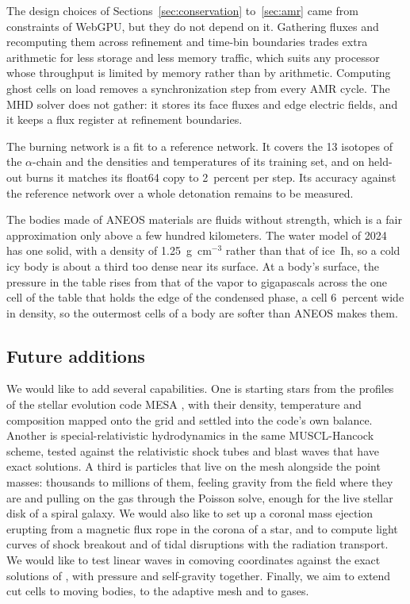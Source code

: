 \documentclass[twocolumn]{aastex701}
\begin{document}
The design choices of Sections~\ref{sec:conservation} to~\ref{sec:amr} came from constraints of WebGPU, but they do not depend on it. Gathering fluxes and recomputing them across refinement and time-bin boundaries trades extra arithmetic for less storage and less memory traffic, which suits any processor whose throughput is limited by memory rather than by arithmetic. Computing ghost cells on load removes a synchronization step from every AMR cycle. The MHD solver does not gather: it stores its face fluxes and edge electric fields, and it keeps a flux register at refinement boundaries.

The burning network is a fit to a reference network. It covers the 13 isotopes of the $\alpha$-chain and the densities and temperatures of its training set, and on held-out burns it matches its float64 copy to 2~percent per step. Its accuracy against the reference network over a whole detonation remains to be measured.

The bodies made of ANEOS materials are fluids without strength, which is a fair approximation only above a few hundred kilometers. The water model of 2024 has one solid, with a density of 1.25~g~cm$^{-3}$ rather than that of ice~Ih, so a cold icy body is about a third too dense near its surface. At a body's surface, the pressure in the table rises from that of the vapor to gigapascals across the one cell of the table that holds the edge of the condensed phase, a cell 6~percent wide in density, so the outermost cells of a body are softer than ANEOS makes them.

\subsection{Future additions}
\label{sec:future}

We would like to add several capabilities. One is starting stars from the profiles of the stellar evolution code MESA \citep{Paxton2011}, with their density, temperature and composition mapped onto the grid and settled into the code's own balance. Another is special-relativistic hydrodynamics in the same MUSCL-Hancock scheme, tested against the relativistic shock tubes and blast waves that have exact solutions. A third is particles that live on the mesh alongside the point masses: thousands to millions of them, feeling gravity from the field where they are and pulling on the gas through the Poisson solve, enough for the live stellar disk of a spiral galaxy. We would also like to set up a coronal mass ejection erupting from a magnetic flux rope in the corona of a star, and to compute light curves of shock breakout and of tidal disruptions with the radiation transport. We would like to test linear waves in comoving coordinates against the exact solutions of \citet{Berlok2022}, with pressure and self-gravity together. Finally, we aim to extend cut cells to moving bodies, to the adaptive mesh and to gases.
\end{document}
